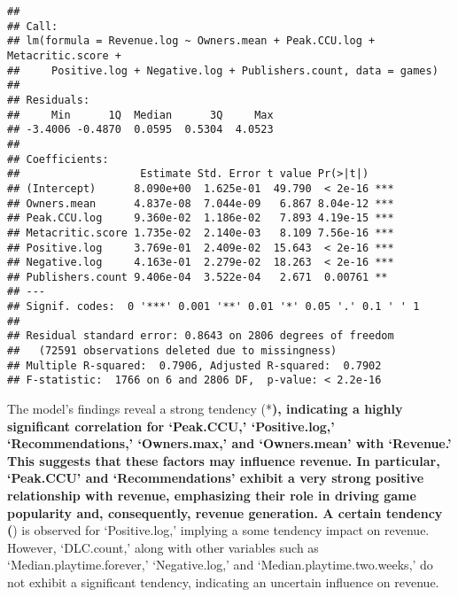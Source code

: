 \documentclass[
]{article}
\begin{document}
\begin{verbatim}
## 
## Call:
## lm(formula = Revenue.log ~ Owners.mean + Peak.CCU.log + Metacritic.score + 
##     Positive.log + Negative.log + Publishers.count, data = games)
## 
## Residuals:
##     Min      1Q  Median      3Q     Max 
## -3.4006 -0.4870  0.0595  0.5304  4.0523 
## 
## Coefficients:
##                   Estimate Std. Error t value Pr(>|t|)    
## (Intercept)      8.090e+00  1.625e-01  49.790  < 2e-16 ***
## Owners.mean      4.837e-08  7.044e-09   6.867 8.04e-12 ***
## Peak.CCU.log     9.360e-02  1.186e-02   7.893 4.19e-15 ***
## Metacritic.score 1.735e-02  2.140e-03   8.109 7.56e-16 ***
## Positive.log     3.769e-01  2.409e-02  15.643  < 2e-16 ***
## Negative.log     4.163e-01  2.279e-02  18.263  < 2e-16 ***
## Publishers.count 9.406e-04  3.522e-04   2.671  0.00761 ** 
## ---
## Signif. codes:  0 '***' 0.001 '**' 0.01 '*' 0.05 '.' 0.1 ' ' 1
## 
## Residual standard error: 0.8643 on 2806 degrees of freedom
##   (72591 observations deleted due to missingness)
## Multiple R-squared:  0.7906, Adjusted R-squared:  0.7902 
## F-statistic:  1766 on 6 and 2806 DF,  p-value: < 2.2e-16
\end{verbatim}

The model's findings reveal a strong tendency (*\textbf{), indicating a
highly significant correlation for `Peak.CCU,' `Positive.log,'
`Recommendations,' `Owners.max,' and `Owners.mean' with `Revenue.' This
suggests that these factors may influence revenue. In particular,
`Peak.CCU' and `Recommendations' exhibit a very strong positive
relationship with revenue, emphasizing their role in driving game
popularity and, consequently, revenue generation. A certain tendency (})
is observed for `Positive.log,' implying a some tendency impact on
revenue. However, `DLC.count,' along with other variables such as
`Median.playtime.forever,' `Negative.log,' and
`Median.playtime.two.weeks,' do not exhibit a significant tendency,
indicating an uncertain influence on revenue.
\end{document}

